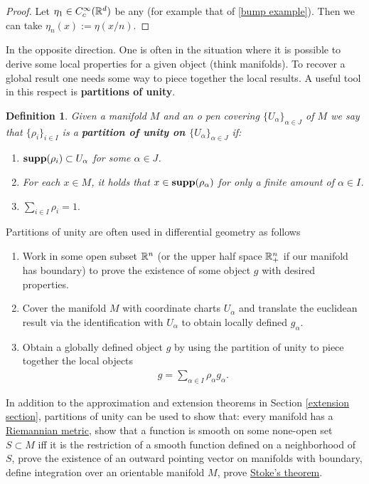 \documentclass[12pt]{article}
\newtheorem{definition}{Definition}
\theoremstyle{remark}
\begin{document}
\begin{proof}
	Let $\eta_1 \in C_c^\infty(\mathbb{R}^d)$ be any (for example that of \eqref{bump example}). Then we can take $\eta_n(x):=\eta(x /n)$.
\end{proof}
In the opposite direction. One is often in the situation where it is possible to derive some local properties for a given object (think manifolds). To recover a global result one needs some way to piece together the local results. A useful tool in this respect is \textbf{partitions of unity}.
\begin{definition}
	Given a manifold $M$ and an o pen covering $\{U_\alpha\}_{\alpha \in  J}$ of $M$ we say that  $\{\rho_i\}_{i\in  I}$ is a \textbf{partition of unity on $\{U_\alpha\}_{\alpha \in  J}$} if:
	\begin{enumerate}
		\item  $\mathbf{supp}(\rho_i)\subset U_\alpha $ for some $\alpha \in J$.
		\item For each $x \in M$, it holds that $x \in \mathbf{supp}(\rho_\alpha)$ for only a finite amount of $\alpha \in I$.
		\item $\sum_{i \in I}\rho _i =1.$
	\end{enumerate}
\end{definition}
Partitions of unity are often used in differential geometry as follows
\begin{enumerate}
	\item Work in some open subset $\mathbb{R}^n$ (or the upper half space $\mathbb{R}^n_+$ if our manifold has boundary) to prove the existence of some object $g$ with desired properties.
	\item  Cover the manifold $M$ with coordinate charts $U_\alpha$ and translate the euclidean result via the identification with $U_\alpha$ to obtain locally defined $g_\alpha$.
	\item Obtain a globally defined object $g$ by using the partition of unity to piece together the local objects
	      \begin{align*}
		      g=\sum_{\alpha \in I}\rho_\alpha g_\alpha .
	      \end{align*}
\end{enumerate}
In addition to the approximation and extension theorems in Section \ref{extension section}, partitions of unity can be used to show that: every manifold has a \href{https://en.wikipedia.org/wiki/Riemannian_manifold}{Riemannian metric}, show that a function is smooth on some none-open set $S \subset M$ iff it is the restriction of a smooth function defined on a neighborhood of $S$, prove the existence of an outward pointing vector on manifolds with boundary, define integration over an orientable manifold $M$, prove \href{https://en.wikipedia.org/wiki/Generalized_Stokes_theorem}{Stoke's theorem}.
\end{document}
